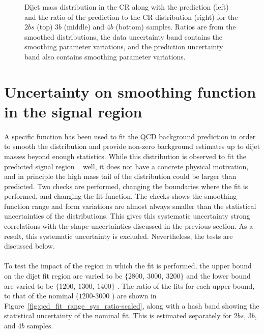 \begin{figure}[htbp!]
\begin{center}
\caption{Dijet mass distribution in the CR along with the prediction (left) and the ratio of the prediction to the CR distribution (right)  for the $2bs$ (top) $3b$ (middle) and $4b$ (bottom) samples.  Ratios are from the smoothed distributions, the data uncertainty band contains the smoothing parameter variations, and the prediction uncertainty band also contains smoothing parameter variations.}
\label{fig:qcd_shape_fit}
\end{center}
\end{figure}

\section{Uncertainty on smoothing function in the signal region}
\label{unc-smooth-qcd-in-sr}

\paragraph{}
A specific function has been used to fit the QCD background prediction in order to smooth the distribution and provide non-zero background estimates up to dijet masses beyond enough statistics.  
While this distribution is observed to fit the predicted signal region \mtwoJ~ well, it does not have a concrete physical motivation, and in principle the high mass tail of the distribution could be larger than predicted.
Two checks are performed, changing the boundaries where the fit is performed, and changing the fit function.
The checks shows the smoothing function range and form variations are almost always smaller than the statistical uncertainties of the distributions.
This gives this systematic uncertainty strong correlations with the shape uncertainties discussed in the previous section.
As a result, this systematic uncertainty is excluded.
Nevertheless, the tests are discussed below.

\paragraph{}
To test the impact of the region in which the fit is performed, the upper bound on the dijet fit region are varied to be $\{2800,\ 3000,\ 3200\}$ \GeV and the lower bound are varied to be $\{1200,\ 1300,\ 1400\}$ \GeV.  
The ratio of the fits for each upper bound, to that of the nominal ($1200$-$3000$ \GeV) are shown in Figure~\ref{fig:qcd_fit_range_sys_ratio-scaled}, along with a hash band showing the statistical uncertainty of the nominal fit.
This is estimated separately for $2bs$, $3b$, and $4b$ samples.

